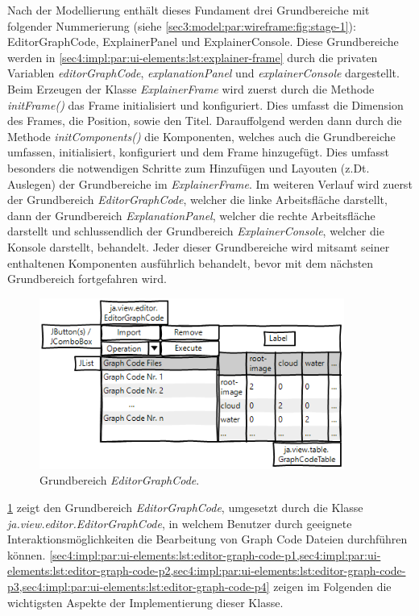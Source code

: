 Nach der Modellierung enthält dieses Fundament drei Grundbereiche mit folgender Nummerierung (siehe \cref{sec3:model:par:wireframe:fig:stage-1}):  EditorGraphCode,  ExplainerPanel und  ExplainerConsole.
Diese Grundbereiche werden in \cref{sec4:impl:par:ui-elements:lst:explainer-frame} durch die privaten Variablen \textit{editorGraphCode}, \textit{explanationPanel} und \textit{explainerConsole} dargestellt.
Beim Erzeugen der Klasse \textit{ExplainerFrame} wird zuerst durch die Methode \textit{initFrame()} das Frame initialisiert und konfiguriert.
Dies umfasst die Dimension des Frames, die Position, sowie den Titel.
Darauffolgend werden dann durch die Methode \textit{initComponents()} die Komponenten, welches auch die Grundbereiche umfassen, initialisiert, konfiguriert und dem Frame hinzugefügt.
Dies umfasst besonders die notwendigen Schritte zum Hinzufügen und Layouten (z.Dt. Auslegen) der Grundbereiche im \textit{ExplainerFrame}.
Im weiteren Verlauf wird zuerst der Grundbereich \textit{EditorGraphCode}, welcher die linke Arbeitsfläche darstellt, dann der Grundbereich \textit{ExplanationPanel}, welcher die rechte Arbeitsfläche darstellt und schlussendlich der Grundbereich \textit{ExplainerConsole}, welcher die Konsole darstellt, behandelt.
Jeder dieser Grundbereiche wird mitsamt seiner enthaltenen Komponenten ausführlich behandelt, bevor mit dem nächsten Grundbereich fortgefahren wird.

\begin{figure}[!ht]
  \includegraphics[width=10cm]{chapter/chapter_4/wireframe-impl-left}
  \caption{Grundbereich \textit{EditorGraphCode}.}
  \label{sec4:impl:subsubsec:ui:fig:wireframe-editor-graph-code}
\end{figure}

\cref{sec4:impl:subsubsec:ui:fig:wireframe-editor-graph-code} zeigt den Grundbereich \textit{EditorGraphCode}, umgesetzt durch die Klasse \textit{ja.view.editor.EditorGraphCode}, in welchem Benutzer durch geeignete Interaktionsmöglichkeiten die Bearbeitung von Graph Code Dateien durchführen können.
\cref{sec4:impl:par:ui-elements:lst:editor-graph-code-p1,sec4:impl:par:ui-elements:lst:editor-graph-code-p2,sec4:impl:par:ui-elements:lst:editor-graph-code-p3,sec4:impl:par:ui-elements:lst:editor-graph-code-p4} zeigen im Folgenden die wichtigsten Aspekte der Implementierung dieser Klasse.

